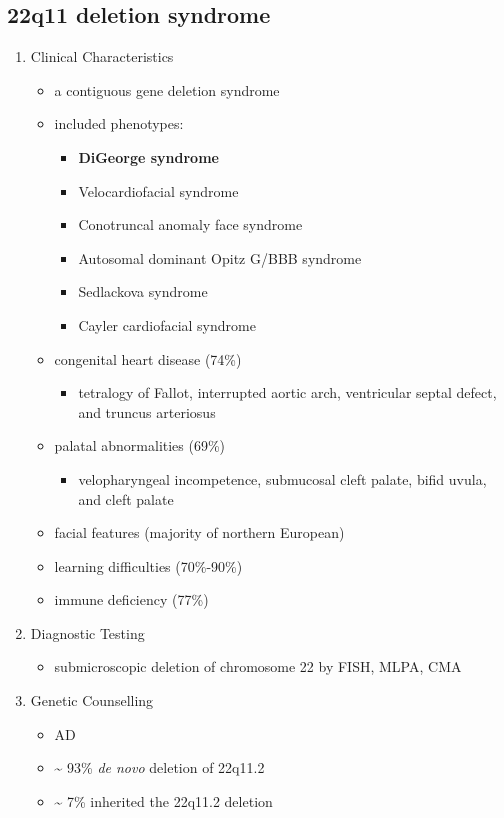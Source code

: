 \documentclass[12pt]{scrartcl}
\begin{document}
\subsection{22q11 deletion syndrome}
\label{sec:orgbf6d43d}
\begin{enumerate}
\item Clinical Characteristics
\label{sec:org7ea1bed}
\begin{itemize}
\item a contiguous gene deletion syndrome
\item included phenotypes:
\begin{itemize}
\item \textbf{DiGeorge syndrome}
\item Velocardiofacial syndrome
\item Conotruncal anomaly face syndrome
\item Autosomal dominant Opitz G/BBB syndrome
\item Sedlackova syndrome
\item Cayler cardiofacial syndrome
\end{itemize}

\item congenital heart disease (74\%)
\begin{itemize}
\item tetralogy of Fallot, interrupted aortic arch, ventricular septal defect, and truncus arteriosus
\end{itemize}
\item palatal abnormalities (69\%)
\begin{itemize}
\item velopharyngeal incompetence, submucosal cleft palate, bifid uvula, and cleft palate
\end{itemize}
\item facial features (majority of northern European)
\item learning difficulties (70\%-90\%)
\item immune deficiency (77\%)
\end{itemize}

\item Diagnostic Testing
\label{sec:org6719566}
\begin{itemize}
\item submicroscopic deletion of chromosome 22 by FISH, MLPA, CMA
\end{itemize}

\item Genetic Counselling
\label{sec:org7fe4e00}
\begin{itemize}
\item AD
\item \textasciitilde{} 93\% \emph{de novo} deletion of 22q11.2
\item \textasciitilde{} 7\% inherited the 22q11.2 deletion
\end{itemize}
\end{enumerate}
\end{document}
